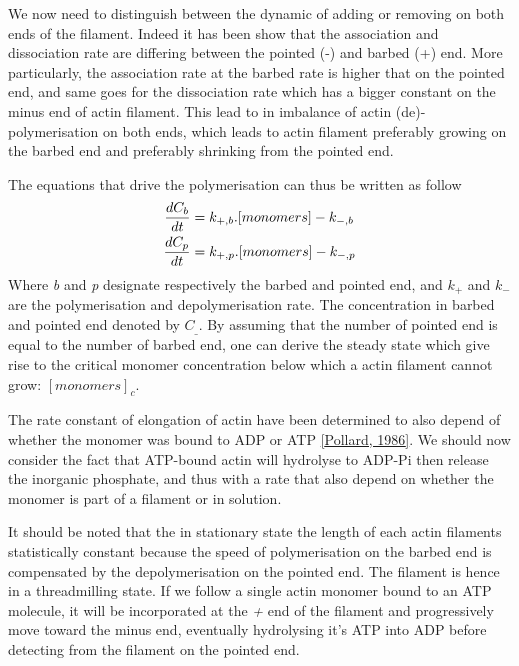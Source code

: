 \documentclass[A4paperpaper,11pt,english]{sphinxmanual}
\begin{document}
We now need to distinguish between the dynamic of adding or removing on both
ends of the filament. Indeed it has been show that the association and
dissociation rate are differing between the pointed (-) and barbed (+) end.
More particularly, the association rate at the barbed rate is higher that on
the pointed end, and same goes for the dissociation rate which has a bigger
constant on the minus end of actin filament. This lead to in imbalance of actin
(de)-polymerisation on both ends, which leads to actin filament preferably
growing on the barbed end and preferably shrinking from the pointed end.

The equations that drive the polymerisation can thus be written as follow
\begin{gather}
\begin{split}\frac{dC_b}{dt} &= k_{+,b}.[monomers] - k_{-,b} \\
\frac{dC_p}{dt} &= k_{+,p}.[monomers] - k_{-,p} \\\end{split}\notag
\end{gather}
Where \emph{b} and \emph{p} designate respectively the barbed and pointed end, and
\(k_+\) and \(k_-\) are the polymerisation and depolymerisation rate.
The concentration in barbed and pointed end denoted by \(C_\_\). By
assuming that the number of pointed end is equal to the number of barbed end,
one can derive the steady state which give rise to the critical monomer
concentration below which a actin filament cannot grow: \([monomers]_c\).

The rate constant of elongation of actin have been determined to also depend of
whether the monomer was bound to ADP or ATP {\hyperref[bibitem:pollard1986]{{[}Pollard,  1986{]}}}. We should now
consider the fact that ATP-bound actin will hydrolyse to ADP-Pi then release
the inorganic phosphate, and thus with a rate that also depend on whether the
monomer is part of a filament or in solution.

It should be noted that the in stationary state the length of each actin
filaments statistically constant because the speed of polymerisation on the
barbed end is compensated by the depolymerisation on the pointed end. The
filament is hence in a threadmilling state. If we follow a single actin monomer
bound to an ATP molecule, it will be incorporated at the \emph{+} end of the
filament and progressively move toward the minus end, eventually hydrolysing
it's ATP into ADP before detecting from the filament on the pointed end.
\end{document}
